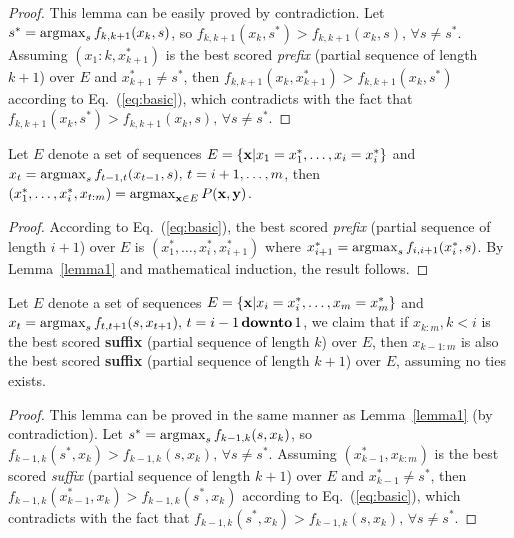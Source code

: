 \begin{proof}
This lemma can be easily proved by contradiction.
Let $s^* = \operatorname*{argmax}_{s} f_{k, k+1}(x_k, s)$, so $f_{k,k+1}(x_k, s^*) > f_{k,k+1}(x_k, s), \, \forall s \ne s^*$.
Assuming $(x_1:k, x_{k+1}^*)$ is the best scored \emph{prefix} (partial sequence of length $k+1$) over $E$ and $x_{k+1}^* \ne s^*$,
then $f_{k,k+1}(x_k, x_{k+1}^*) > f_{k,k+1}(x_k, s^*)$ according to Eq.~(\ref{eq:basic}), 
which contradicts with the fact that $f_{k,k+1}(x_k, s^*) > f_{k,k+1}(x_k, s), \, \forall s \ne s^*$.
\end{proof}

\begin{theorem}
\label{theorem1}
Let $E$ denote a set of sequences $E = \{\mathbf{x} |x_1 = x_1^*, \dots, x_i = x_i^*\}$ and
$x_t = \operatorname*{argmax}_{s} f_{t-1, t}(x_{t-1}, s), \, t = i+1,\dots,m$, 
then $(x_1^*,\dots,x_i^*, x_{t:m}) = \operatorname*{argmax}_{\mathbf{x} \in E} P(\mathbf{x},\mathbf{y})$.
\end{theorem}

\begin{proof}
According to Eq.~(\ref{eq:basic}), the best scored \emph{prefix} (partial sequence of length $i+1$) over $E$ is $(x_1^*,\dots,x_i^*,x_{i+1}^*)$
where $x_{i+1}^* = \operatorname*{argmax}_{s} f_{i, i+1}(x_i^*, s)$.
By Lemma~\ref{lemma1} and mathematical induction, the result follows.
\end{proof}

\begin{lemma}
\label{lemma2}
Let $E$ denote a set of sequences $E = \{\mathbf{x} |x_i = x_i^*, \dots, x_m = x_m^*\}$ and
$x_t = \operatorname*{argmax}_{s} f_{t, t+1}(s, x_{t+1}), \, t = i-1 \,\textbf{downto}\, 1$, 
we claim that if $x_{k:m}, k < i$ is the best scored \textbf{suffix} (partial sequence of length $k$) over $E$, 
then $x_{k-1:m}$ is also the best scored \textbf{suffix} (partial sequence of length $k+1$) over $E$,
assuming no ties exists.
\end{lemma}

\begin{proof}
This lemma can be proved in the same manner as Lemma~\ref{lemma1} (by contradiction).
Let $s^* = \operatorname*{argmax}_{s} f_{k-1, k}(s, x_k)$, so $f_{k-1,k}(s^*, x_k) > f_{k-1,k}(s, x_k), \, \forall s \ne s^*$.
Assuming $(x_{k-1}^*, x_{k:m})$ is the best scored \emph{suffix} (partial sequence of length $k+1$) over $E$ and $x_{k-1}^* \ne s^*$,
then $f_{k-1,k}(x_{k-1}^*, x_k) > f_{k-1,k}(s^*, x_k)$ according to Eq.~(\ref{eq:basic}), 
which contradicts with the fact that $f_{k-1,k}(s^*, x_k) > f_{k-1,k}(s, x_k), \, \forall s \ne s^*$.
\end{proof}

